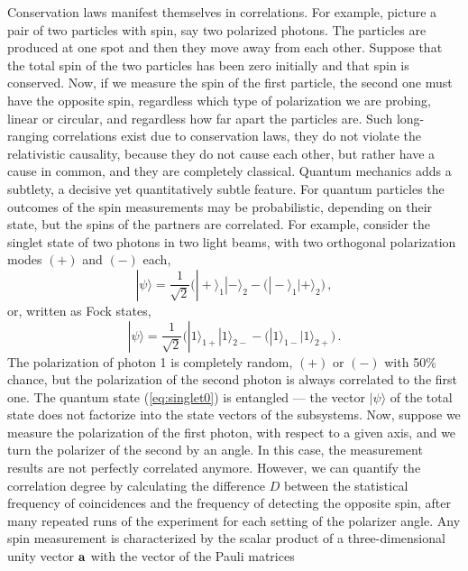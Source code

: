 \documentclass[12pt,amsmath,amssymb]{article}
\numberwithin{equation}{section}
\begin{document}
Conservation laws manifest themselves in correlations. For example,
picture a pair of two particles with spin, say two polarized photons.
The particles are produced at one spot and then they move away from
each other. Suppose that the total spin of the two particles has been zero
initially and that spin is conserved. Now, if we measure the spin of
the first particle, the second one must have the opposite spin,
regardless which type of polarization we are probing, linear or circular,
and regardless how far apart the particles are. Such long-ranging
correlations exist due to conservation laws, they do not violate the
relativistic causality, because they do not cause each other, but rather
have a cause in common, and they are completely classical.
Quantum mechanics adds a subtlety, a decisive yet quantitatively
subtle feature. For quantum particles the outcomes of the spin
measurements may be probabilistic, depending on their state,
but the spins of the partners are correlated. For example,
consider the singlet state of two photons in two light beams,
with two orthogonal polarization modes $(+)$ and $(-)$ each,
\begin{equation}
\label{eq:singlet0}
|\psi\rangle
= \frac{1}{\sqrt{2}}
\big(|+\rangle_{1}|-\rangle_{2}-
\big(|-\rangle_{1}|+\rangle_{2}\big) \,,
\end{equation}
or, written as Fock states,
\begin{equation}
\label{eq:singlet}
|\psi\rangle
= \frac{1}{\sqrt{2}}
\big(|1\rangle_{1+}|1\rangle_{2-}-
\big(|1\rangle_{1-}|1\rangle_{2+}\big) \,.
\end{equation}
The polarization of photon 1 is completely random, $(+)$ or $(-)$
with 50\% chance, but the polarization of the second
photon is always correlated to the first one.
The quantum state (\ref{eq:singlet0}) is entangled --- the vector
$|\psi\rangle$ of the total state
does not factorize into the state vectors of the subsystems.
Now, suppose we measure the polarization of the first
photon, with respect to a given axis, and we turn the polarizer
of the second by an angle. In this case, the measurement
results are not perfectly correlated anymore.
However, we can quantify the correlation degree
by calculating the difference $D$ between the
statistical frequency of coincidences and the frequency of
detecting the opposite spin,
after many repeated runs of the experiment
for each setting of the polarizer angle.
Any spin measurement is characterized by the scalar
product of a three-dimensional unity vector ${\bf a}$ with
the vector of the Pauli matrices
\end{document}
